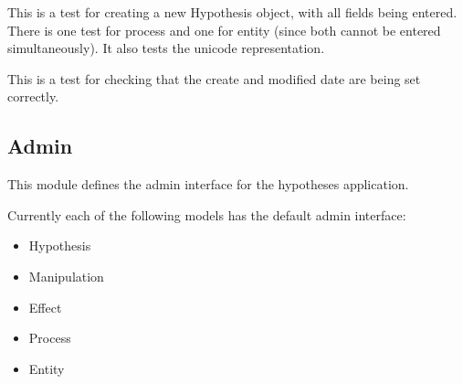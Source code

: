 \documentclass[letterpaper,10pt,english]{sphinxmanual}
\begin{document}
\begin{fulllineitems}
\label{api:experimentdb.hypotheses.tests.test_create_hypothesis_all_fields_entity}
This is a test for creating a new Hypothesis object, with all fields being entered.  There is one test for process and one for entity (since both cannot be entered simultaneously).  It also tests the unicode representation.


\end{fulllineitems}


\begin{fulllineitems}
\label{api:experimentdb.hypotheses.tests.test_create_hypothesis_create_date}
This is a test for checking that the create and modified date are being set correctly.


\end{fulllineitems}



\subsection{Admin}
\label{api:admin}\label{api:module-experimentdb.hypotheses.admin}
This module defines the admin interface for the hypotheses application.


Currently each of the following models has the default admin interface:

\begin{itemize}
\item {} 
Hypothesis


\item {} 
Manipulation


\item {} 
Effect


\item {} 
Process


\item {} 
Entity


\end{itemize}

\begin{fulllineitems}
\label{api:experimentdb.hypotheses.admin.CitationTypeAdmin}~

\begin{fulllineitems}
\label{api:experimentdb.hypotheses.admin.CitationTypeAdmin.media}
\end{fulllineitems}


\end{fulllineitems}
\end{document}
